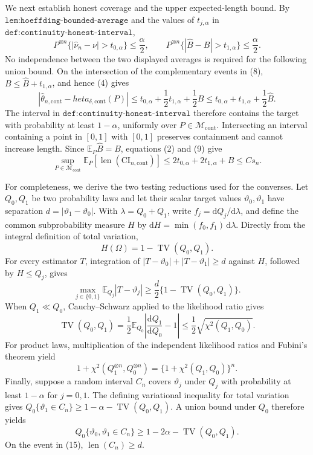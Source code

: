 We next establish honest coverage and the upper expected-length bound.  By \(\texttt{lem:hoeffding-bounded-average}\) and the values of \(t_{j,\alpha}\) in \(\texttt{def:continuity-honest-interval}\),
\[
 P^{\otimes n}\{|\widehat\nu_n-\nu|>t_{0,\alpha}\}\leq\frac\alpha2,
 \qquad
 P^{\otimes n}\{|\widehat B-B|>t_{1,\alpha}\}\leq\frac\alpha2.
 \tag{8}
\]
No independence between the two displayed averages is required for the following union bound.  On the intersection of the complementary events in (8), \(B\leq\widehat B+t_{1,\alpha}\), and hence (4) gives
\[
 |\widehat\theta_{n,\mathrm{cont}}-	heta_{\delta,\mathrm{cont}}(P)|
 \leq t_{0,\alpha}+\frac12t_{1,\alpha}+\frac12B
 \leq t_{0,\alpha}+t_{1,\alpha}+\frac12\widehat B.
 \tag{9}
\]
The interval in \(\texttt{def:continuity-honest-interval}\) therefore contains the target with probability at least \(1-\alpha\), uniformly over \(P\in\mathcal M_{\mathrm{cont}}\).  Intersecting an interval containing a point in \([0,1]\) with \([0,1]\) preserves containment and cannot increase length.  Since \(\mathbb E_P\widehat B=B\), equations (2) and (9) give
\[
 \sup_{P\in\mathcal M_{\mathrm{cont}}}
 \mathbb E_P[\operatorname{len}(\mathrm{CI}_{n,\mathrm{cont}})]
 \leq2t_{0,\alpha}+2t_{1,\alpha}+B
 \leq Cs_n.
 \tag{10}
\]

For completeness, we derive the two testing reductions used for the converses.  Let \(Q_0,Q_1\) be two probability laws and let their scalar target values \(\vartheta_0,\vartheta_1\) have separation \(d=|\vartheta_1-\vartheta_0|\).  With \(\lambda=Q_0+Q_1\), write \(f_j=\mathrm dQ_j/\mathrm d\lambda\), and define the common subprobability measure \(H\) by \(\mathrm dH=\min(f_0,f_1)\,\mathrm d\lambda\).  Directly from the integral definition of total variation,
\[
 H(\Omega)=1-\operatorname{TV}(Q_0,Q_1).
 \tag{11}
\]
For every estimator \(T\), integration of
\(|T-\vartheta_0|+|T-\vartheta_1|\geq d\) against \(H\), followed by \(H\leq Q_j\), gives
\[
 \max_{j\in\{0,1\}}\mathbb E_{Q_j}|T-\vartheta_j|
 \geq\frac d2\{1-\operatorname{TV}(Q_0,Q_1)\}.
 \tag{12}
\]
When \(Q_1\ll Q_0\), Cauchy--Schwarz applied to the likelihood ratio gives
\[
 \operatorname{TV}(Q_0,Q_1)
 =\frac12\mathbb E_{Q_0}\left|\frac{\mathrm dQ_1}{\mathrm dQ_0}-1\right|
 \leq\frac12\sqrt{\chi^2(Q_1,Q_0)}.
 \tag{13}
\]
For product laws, multiplication of the independent likelihood ratios and Fubini's theorem yield
\[
 1+\chi^2(Q_1^{\otimes n},Q_0^{\otimes n})
 =\{1+\chi^2(Q_1,Q_0)\}^n.
 \tag{14}
\]
Finally, suppose a random interval \(C_n\) covers \(\vartheta_j\) under \(Q_j\) with probability at least \(1-\alpha\) for \(j=0,1\).  The defining variational inequality for total variation gives
\(Q_0\{\vartheta_1\in C_n\}\geq1-\alpha-\operatorname{TV}(Q_0,Q_1)\).  A union bound under \(Q_0\) therefore yields
\[
 Q_0\{\vartheta_0,\vartheta_1\in C_n\}
 \geq1-2\alpha-\operatorname{TV}(Q_0,Q_1).
 \tag{15}
\]
On the event in (15), \(\operatorname{len}(C_n)\geq d\).

